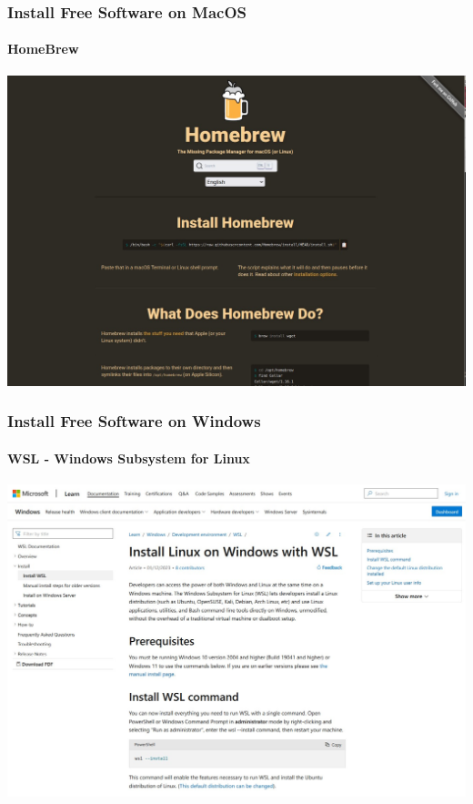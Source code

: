 \documentclass[unknownkeysallowed, 10pt, a4 paper, handout]{beamer}
\begin{document}
\begin{frame}[label=macos]
  \frametitle{Install Free Software on MacOS}
  \framesubtitle{HomeBrew}
  \begin{center}
    \includegraphics[scale=0.25]{pics/brew.png}
  \end{center}
\end{frame}


\begin{frame}[label=windows]
  \frametitle{Install Free Software on Windows}
  \framesubtitle{WSL - Windows Subsystem for Linux}
  \begin{center}
    \includegraphics[scale=0.25]{pics/WSL.png}
  \end{center}
\end{frame}
\end{document}
